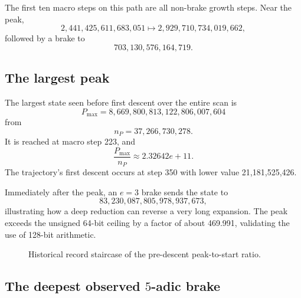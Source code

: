 \documentclass[11pt]{article}
\theoremstyle{definition}
\begin{document}
The first ten macro steps on this path are all non-brake growth steps. Near the peak,
\[
2{,}441{,}425{,}611{,}683{,}051
\mapsto
2{,}929{,}710{,}734{,}019{,}662,
\]
followed by a brake to
\[
703{,}130{,}576{,}164{,}719.
\]

\subsection{The largest peak}

The largest state seen before first descent over the entire scan is
\[
P_{\max}
=
8{,}669{,}800{,}813{,}122{,}806{,}007{,}604
\]
from
\[
n_P=37{,}266{,}730{,}278.
\]
It is reached at macro step 223, and
\[
\frac{P_{\max}}{n_P}
\approx 2.32642e+11.
\]
The trajectory's first descent occurs at step 350 with lower value 21{,}181{,}525{,}426.

Immediately after the peak, an $e=3$ brake sends the state to
\[
83{,}230{,}087{,}805{,}978{,}937{,}673,
\]
illustrating how a deep reduction can reverse a very long expansion. The peak exceeds the unsigned 64-bit ceiling by a factor of about 469.991, validating the use of 128-bit arithmetic.

\begin{figure}[H]
\centering
{}
\caption{Historical record staircase of the pre-descent peak-to-start ratio.}
\end{figure}

\subsection{The deepest observed $5$-adic brake}
\end{document}
